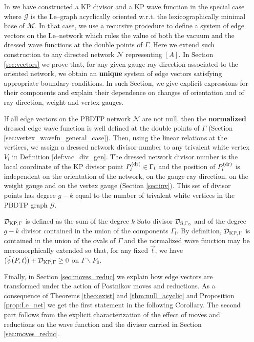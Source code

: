 \documentclass[11pt]{amsart}
\theoremstyle{plain}
\numberwithin{equation}{section}
\def \DKP {{\mathcal D}_{\textup{\scriptsize KP},\Gamma}}
\def \DS {{\mathcal D}_{\textup{\scriptsize S},\Gamma_0}}
\def \Pdr {P^{\textup{\scriptsize (dr)}}}
\begin{document}
In \cite{AG3} we have constructed a KP divisor and a KP wave function in the special case where $\mathcal G$ is the Le--graph acyclically oriented w.r.t. the lexicographically minimal base of $\mathcal M$. In that case, we use a recursive procedure to define a system of edge vectors on the Le--network which rules the value of both the vacuum and the dressed wave functions at the double points of $\Gamma$. 
Here we extend such construction to any directed network ${\mathcal N}$ representing $[A]$. In Section \ref{sec:vectors} we prove that, for any given gauge ray direction associated to the oriented network, we obtain an \textbf{unique} system of edge vectors satisfying appropriate boundary conditions. In such Section, we give explicit expressions for their components and
explain their dependence on changes of orientation and of ray direction, weight and vertex gauges. 

If all edge vectors on the PBDTP network $\mathcal N$ are not null, then the \textbf{normalized} dressed edge wave function is well defined at the double points of $\Gamma$ (Section \ref{sec:vertex_wavefn_general_case}).  
Then, using the linear relations at the vertices, we assign a dressed network divisor number to any trivalent white vertex $V_l$ in Definition \ref{def:vac_div_gen}. 
The dressed network divisor number is the local coordinate of the KP divisor point $\Pdr_l \in \Gamma_l$ and the position of $\Pdr_l$ is independent on the orientation of the network, on the gauge ray direction, on the weight gauge and on the vertex gauge (Section \ref{sec:inv}). This set of divisor points has degree $g-k$ equal to the number of trivalent white vertices in the PBDTP graph $\mathcal G$.

$\DKP$ is defined as the sum of the degree $k$ Sato divisor $\DS$ 
and of the degree $g-k$ divisor contained in the union of the components $\Gamma_l$.
By definition, $\DKP$ is contained in the union of the ovals of $\Gamma$ and the normalized wave function may be meromorphically extended so that, for any fixed $\vec t$, we have $({\hat \psi} (P, \vec t))+\DKP\ge 0$ on $\Gamma\backslash P_0$.

\smallskip

Finally, in Section \ref{sec:moves_reduc} we explain how edge vectors are transformed under the action of Postnikov moves and reductions. As a consequence of Theorems \ref{theo:exist} and \ref{thm:null_acyclic} and Proposition \ref{prop:Le_net} we get the first statement in the following Corollary. The second part follows from the explicit characterization of the effect of moves and reductions on the wave function and the divisor carried in Section \ref{sec:moves_reduc}.
\end{document}
